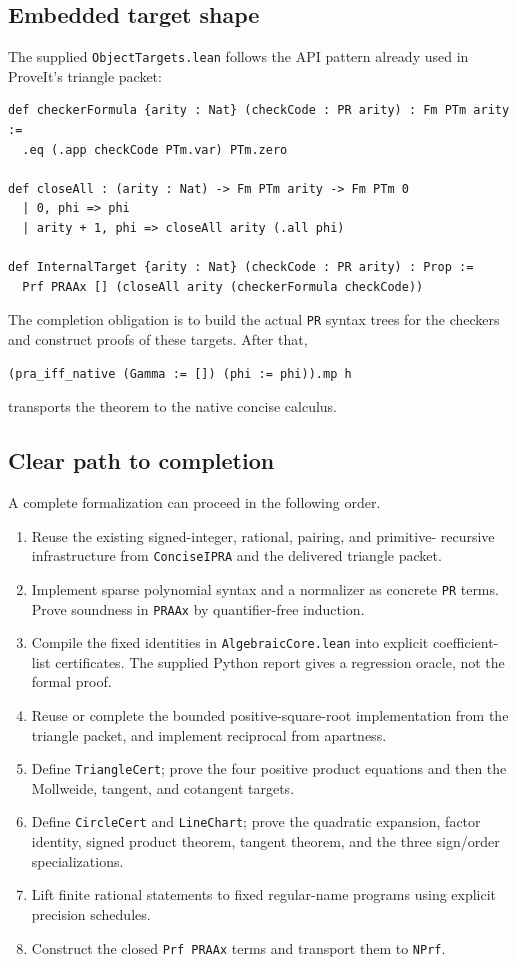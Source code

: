 \documentclass[11pt,letterpaper]{article}
\theoremstyle{definition}
\theoremstyle{remark}
\newcommand{\code}[1]{\texttt{#1}}
\begin{document}
\subsection{Embedded target shape}

The supplied \code{ObjectTargets.lean} follows the API pattern already used in
ProveIt's triangle packet:
\begin{lstlisting}[language={}]
def checkerFormula {arity : Nat} (checkCode : PR arity) : Fm PTm arity :=
  .eq (.app checkCode PTm.var) PTm.zero

def closeAll : (arity : Nat) -> Fm PTm arity -> Fm PTm 0
  | 0, phi => phi
  | arity + 1, phi => closeAll arity (.all phi)

def InternalTarget {arity : Nat} (checkCode : PR arity) : Prop :=
  Prf PRAAx [] (closeAll arity (checkerFormula checkCode))
\end{lstlisting}
The completion obligation is to build the actual \code{PR} syntax trees for
the checkers and construct proofs of these targets.  After that,
\begin{lstlisting}[language={}]
(pra_iff_native (Gamma := []) (phi := phi)).mp h
\end{lstlisting}
transports the theorem to the native concise calculus.

\subsection{Clear path to completion}

A complete formalization can proceed in the following order.

\begin{enumerate}
\item Reuse the existing signed-integer, rational, pairing, and primitive-
recursive infrastructure from \texttt{ConciseIPRA} and the delivered triangle
packet.
\item Implement sparse polynomial syntax and a normalizer as concrete
\code{PR} terms.  Prove soundness in \code{PRAAx} by quantifier-free induction.
\item Compile the fixed identities in \code{AlgebraicCore.lean} into explicit
coefficient-list certificates.  The supplied Python report gives a regression
oracle, not the formal proof.
\item Reuse or complete the bounded positive-square-root implementation from
the triangle packet, and implement reciprocal from apartness.
\item Define \code{TriangleCert}; prove the four positive product equations
and then the Mollweide, tangent, and cotangent targets.
\item Define \code{CircleCert} and \code{LineChart}; prove the quadratic
expansion, factor identity, signed product theorem, tangent theorem, and the
three sign/order specializations.
\item Lift finite rational statements to fixed regular-name programs using
explicit precision schedules.
\item Construct the closed \code{Prf PRAAx} terms and transport them to
\code{NPrf}.
\end{enumerate}
\end{document}
